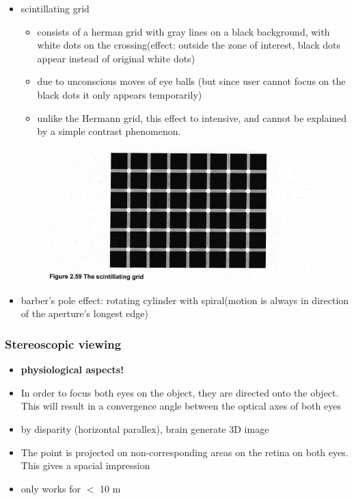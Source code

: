 \documentclass{standalone}
\begin{document}
\begin{itemize}
\begin{figure}[H]
		\end{figure}
		\item scintillating grid
			\begin{itemize} 
				\item consists of a herman grid with gray lines on a black background, with white dots on the crossing(effect: outside the zone of interest, black dots appear instead of original white dots)
				\item due to unconscious moves of eye balls (but since user cannot focus on the black dots it only appears temporarily)
				\item unlike the Hermann grid, this effect to intensive, and cannot be explained by a simple contrast phenomenon.
			\end{itemize}
		\begin{figure}[H]
			\centering
			\includegraphics[width = 0.7\linewidth]{Figures/2_59.png}
		\end{figure}
		\item barber's pole effect: rotating cylinder with spiral(motion is always in direction of the aperture's longest edge)
\end{itemize}
\subsubsection*{Stereoscopic viewing}
\begin{itemize}
	\item \textbf{physiological aspects!}
	\item In order to focus both eyes on the object, they are directed onto the object. This will result in a convergence angle between the optical axes of both eyes	
	\item by disparity (horizontal parallex), brain generate 3D image
	\item The point is projected on non-corresponding areas on the retina on both eyes. This gives a spacial impression
	\item only works for $<$ 10 m 
\end{itemize}
\end{document}
